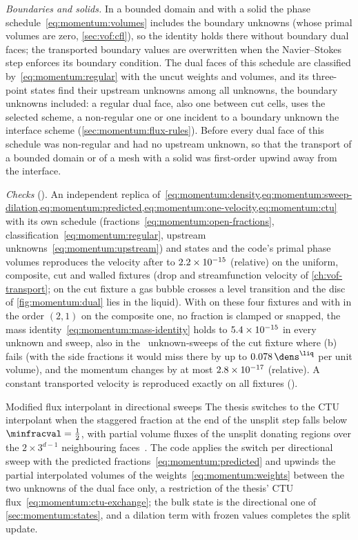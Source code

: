 \emph{Boundaries and solids.} In a bounded domain and with a solid the phase
schedule~\cref{eq:momentum:volumes} includes the boundary unknowns (whose
primal volumes are zero, \cref{sec:vof:cfl}), so the identity holds there
without boundary dual faces; the transported boundary values are overwritten
when the Navier--Stokes step enforces its boundary condition. The dual faces
of this schedule are classified by~\cref{eq:momentum:regular} with the uncut
weights and volumes, and its three-point states find their upstream unknowns
among all unknowns, the boundary unknowns included: a regular dual face, also
one between cut cells, uses the selected scheme, a non-regular one or one
incident to a boundary unknown the interface scheme
(\cref{sec:momentum:flux-rules}). Before  every dual face of this
schedule was non-regular and had no upstream unknown, so that the transport
of a bounded domain or of a mesh with a solid was first-order upwind away
from the interface.

\emph{Checks} (). An independent replica
of~\cref{eq:momentum:density,eq:momentum:sweep-dilation,eq:momentum:predicted,eq:momentum:one-velocity,eq:momentum:ctu}
with its own schedule (fractions~\cref{eq:momentum:open-fractions},
classification~\cref{eq:momentum:regular}, upstream
unknowns~\cref{eq:momentum:upstream}) and states and the code's primal phase
volumes reproduces the velocity after  to $2.2\times10^{-15}$
(relative) on the uniform, composite, cut and walled fixtures (drop and
streamfunction velocity of \cref{ch:vof-transport}; on the cut fixture a gas
bubble crosses a level transition and the disc of \cref{fig:momentum:dual}
lies in the liquid). With  on these four fixtures and
with  in the order $(2,1)$ on the composite one,
no fraction is clamped or snapped, the mass
identity~\cref{eq:momentum:mass-identity} holds to $5.4\times10^{-15}$ in every
unknown and sweep, also in the \chkMomOneCutDofs\ unknown-sweeps of the cut
fixture where (b) fails (with the side fractions it would miss there by up
to $\chkMomOneCutScalarMass\,\dens^{\liq}$ per unit volume), and the momentum
changes by at most $2.8\times10^{-17}$ (relative). A constant transported
velocity is reproduced exactly on all fixtures ().

\begin{deviation}{Modified flux interpolant in directional sweeps}
The thesis switches to the CTU interpolant when the staggered fraction at
the end of the unsplit step falls below $\minfracval=\half$, with partial
volume fluxes of the unsplit donating regions over the $2\times3^{d-1}$
neighbouring faces~. The code applies the switch
per directional sweep with the predicted fractions~\cref{eq:momentum:predicted}
and upwinds the partial interpolated volumes of the
weights~\cref{eq:momentum:weights} between the two unknowns of the dual face
only, a restriction of the thesis' CTU flux~\cref{eq:momentum:ctu-exchange};
the bulk state is the directional one of \cref{sec:momentum:states},
and a dilation term with frozen values completes the split update.
\end{deviation}


